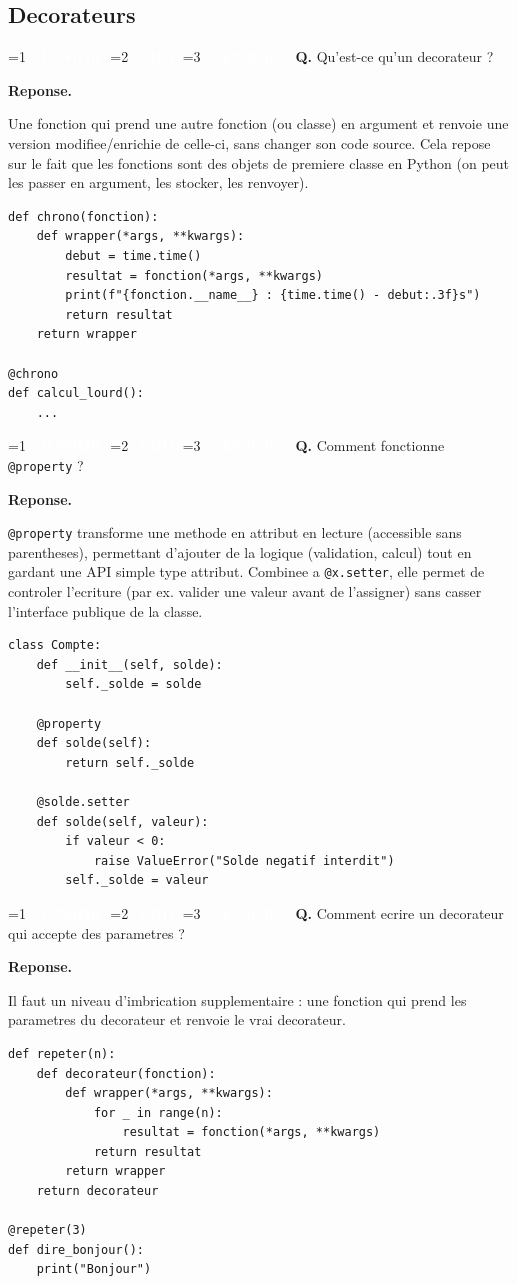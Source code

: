 \documentclass[11pt,a4paper]{article}
\newcommand{\badgeJ}{\textcolor{white}{\colorbox{junior}{\small\bfseries\ JUNIOR\ }}}
\newcommand{\badgeM}{\textcolor{white}{\colorbox{mid}{\small\bfseries\ MID\ }}}
\newcommand{\badgeS}{\textcolor{white}{\colorbox{senior}{\small\bfseries\ SENIOR\ }}}
\newcounter{qcount}
\newenvironment{qa}[2]{%
  \stepcounter{qcount}%
  \par\vspace{6pt}%
  \noindent\colorbox{qbg}{\parbox{\dimexpr\linewidth-12pt}{\vspace{2pt}%
  \ifnum#1=1 \badgeJ\fi\ifnum#1=2 \badgeM\fi\ifnum#1=3 \badgeS\fi
  \ \textbf{Q\theqcount.} #2\vspace{2pt}}}\par\vspace{4pt}%
  \noindent\textbf{\color{accent}Reponse.}\ \ignorespaces
}{%
  \par\vspace{8pt}%
}
\begin{document}
\subsection{Decorateurs}

\begin{qa}{1}{Qu'est-ce qu'un decorateur ?}
Une fonction qui prend une autre fonction (ou classe) en argument et renvoie
une version modifiee/enrichie de celle-ci, sans changer son code source. Cela
repose sur le fait que les fonctions sont des objets de premiere classe en
Python (on peut les passer en argument, les stocker, les renvoyer).
\begin{lstlisting}
def chrono(fonction):
    def wrapper(*args, **kwargs):
        debut = time.time()
        resultat = fonction(*args, **kwargs)
        print(f"{fonction.__name__} : {time.time() - debut:.3f}s")
        return resultat
    return wrapper

@chrono
def calcul_lourd():
    ...
\end{lstlisting}
\end{qa}

\begin{qa}{2}{Comment fonctionne \texttt{@property} ?}
\texttt{@property} transforme une methode en attribut en lecture (accessible
sans parentheses), permettant d'ajouter de la logique (validation, calcul) tout
en gardant une API simple type attribut. Combinee a \texttt{@x.setter}, elle
permet de controler l'ecriture (par ex. valider une valeur avant de
l'assigner) sans casser l'interface publique de la classe.
\begin{lstlisting}
class Compte:
    def __init__(self, solde):
        self._solde = solde

    @property
    def solde(self):
        return self._solde

    @solde.setter
    def solde(self, valeur):
        if valeur < 0:
            raise ValueError("Solde negatif interdit")
        self._solde = valeur
\end{lstlisting}
\end{qa}

\begin{qa}{2}{Comment ecrire un decorateur qui accepte des parametres ?}
Il faut un niveau d'imbrication supplementaire : une fonction qui prend les
parametres du decorateur et renvoie le \og{}vrai\fg{} decorateur.
\begin{lstlisting}
def repeter(n):
    def decorateur(fonction):
        def wrapper(*args, **kwargs):
            for _ in range(n):
                resultat = fonction(*args, **kwargs)
            return resultat
        return wrapper
    return decorateur

@repeter(3)
def dire_bonjour():
    print("Bonjour")
\end{lstlisting}
\end{qa}
\end{document}
